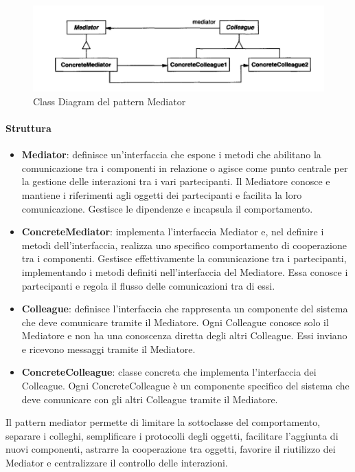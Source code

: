 \begin{figure}[H]
    \centering
    \includegraphics[width=0.75\linewidth]{assets/pattern/mediator/mediator-struttura.png}
    \caption{Class Diagram del pattern Mediator}
\end{figure}

\newpage

\paragraph{Struttura}
\begin{itemize}
    \item \textbf{Mediator}: definisce un’interfaccia che espone i metodi che abilitano la comunicazione tra i componenti in relazione o agisce come punto centrale per la gestione delle interazioni tra i vari partecipanti. Il Mediatore conosce e mantiene i riferimenti agli oggetti dei partecipanti e facilita la loro comunicazione. Gestisce le dipendenze e incapsula il comportamento.
    \item \textbf{ConcreteMediator}: implementa l’interfaccia Mediator e, nel definire i metodi dell’interfaccia, realizza uno specifico comportamento di cooperazione tra i componenti. Gestisce effettivamente la comunicazione tra i partecipanti, implementando i metodi definiti nell'interfaccia del Mediatore. Essa conosce i partecipanti e regola il flusso delle comunicazioni tra di essi.
    \item \textbf{Colleague}: definisce l’interfaccia che rappresenta un componente del sistema che deve comunicare tramite il Mediatore. Ogni Colleague conosce solo il Mediatore e non ha una conoscenza diretta degli altri Colleague. Essi inviano e ricevono messaggi tramite il Mediatore.
    \item \textbf{ConcreteColleague}: classe concreta che implementa l'interfaccia dei Colleague. Ogni ConcreteColleague è un componente specifico del sistema che deve comunicare con gli altri Colleague tramite il Mediatore.
\end{itemize}

Il pattern mediator permette di limitare la sottoclasse del comportamento, separare i colleghi, semplificare i protocolli degli oggetti, facilitare l’aggiunta di nuovi componenti, astrarre la cooperazione tra oggetti, favorire il riutilizzo dei Mediator e centralizzare il controllo delle interazioni.

